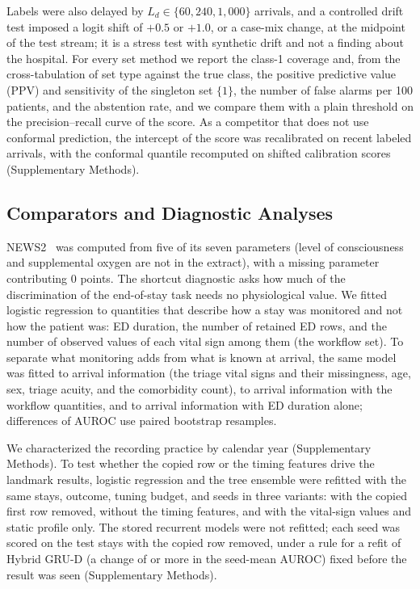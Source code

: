 Labels were also delayed by $L_d \in \{60, 240, 1{,}000\}$ arrivals, and a controlled
drift test imposed a logit shift of $+0.5$ or $+1.0$, or a case-mix change, at the midpoint of the test stream; it is a stress test with synthetic drift and not a finding about the hospital.
For every set method we report the class-1 coverage and, from the cross-tabulation of set type against the true class, the positive predictive value (PPV) and sensitivity of the
singleton set $\{1\}$, the number of false alarms per 100 patients, and the abstention rate, and we compare them with a plain threshold on the precision--recall curve of the score. As a competitor that does not use conformal prediction, the intercept of the score was recalibrated on recent labeled arrivals, with the conformal quantile recomputed on shifted calibration scores (Supplementary Methods).

\subsection{Comparators and Diagnostic Analyses}
\label{sec:methods-diagnostics}

NEWS2~\cite{rcp2017news2} was computed from five of its seven parameters (level of consciousness and supplemental oxygen are not in the
extract), with a missing parameter contributing 0 points. The shortcut diagnostic asks how much of the discrimination of the end-of-stay task needs no physiological value. We fitted logistic
regression to quantities that describe how a stay was monitored and not how the patient was: ED duration, the number of
retained ED rows, and the number of observed values of each vital sign among them (the workflow set). To separate what monitoring adds from what is known at arrival, the same model was fitted to arrival information (the triage vital signs and their missingness, age, sex, triage acuity, and the comorbidity count), to arrival information with the workflow quantities, and to arrival information with ED duration alone; differences of AUROC use paired bootstrap resamples.

We characterized the recording practice by calendar year (Supplementary Methods). To test whether the copied row or the timing features drive the landmark results, logistic regression and the tree ensemble were refitted with the same stays, outcome, tuning budget, and seeds in three variants: with the copied first row removed, without the timing features, and with the vital-sign values and static profile only. The stored recurrent models were not refitted; each seed was scored on the test stays with the copied row removed, under a rule for a refit of Hybrid GRU-D (a change of \RVGrudRule{} or more in the seed-mean AUROC) fixed before the result was seen (Supplementary Methods).

